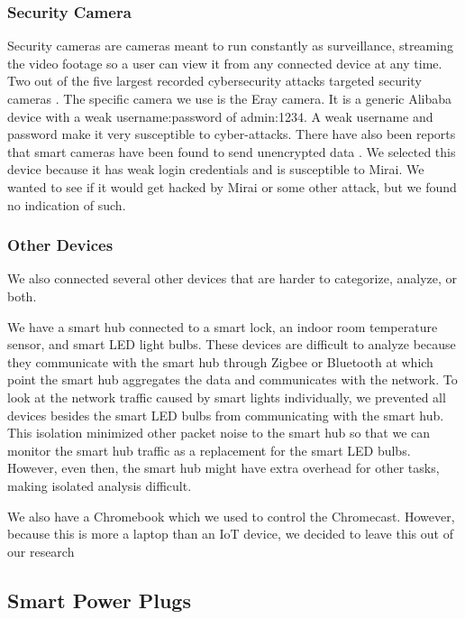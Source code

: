 \subsubsection{Security Camera}

Security cameras are cameras meant to run constantly as surveillance, streaming the video footage so a user can view it from any connected device at any time. Two out of the five largest recorded cybersecurity attacks targeted security cameras \cite{guest_2018}. The specific camera we use is the Eray camera. It is a generic Alibaba device with a weak username:password of admin:1234. A weak username and password make it very susceptible to cyber-attacks. There have also been reports that smart cameras have been found to send unencrypted data \cite{feamster_2016}. We selected this device because it has weak login credentials and is susceptible to Mirai. We wanted to see if it would get hacked by Mirai or some other attack, but we found no indication of such.

\subsubsection{Other Devices}

We also connected several other devices that are harder to categorize, analyze, or both.

We have a smart hub connected to a smart lock, an indoor room temperature sensor, and smart LED light bulbs. These devices are difficult to analyze because they communicate with the smart hub through Zigbee or Bluetooth at which point the smart hub aggregates the data and communicates with the network. To look at the network traffic caused by smart lights individually, we prevented all devices besides the smart LED bulbs from communicating with the smart hub. This isolation minimized other packet noise to the smart hub so that we can monitor the smart hub traffic as a replacement for the smart LED bulbs. However, even then, the smart hub might have extra overhead for other tasks, making isolated analysis difficult.

We also have a Chromebook which we used to control the Chromecast. However, because this is more a laptop than an IoT device, we decided to leave this out of our research

\subsection{Smart Power Plugs}

